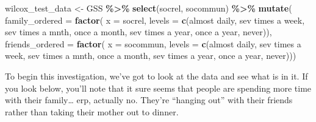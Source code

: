 \documentclass[
]{book}
\newenvironment{Shaded}{\begin{snugshade}}{\end{snugshade}}
\newcommand{\AttributeTok}[1]{\textcolor[rgb]{0.13,0.29,0.53}{#1}}
\newcommand{\FunctionTok}[1]{\textcolor[rgb]{0.13,0.29,0.53}{\textbf{#1}}}
\newcommand{\NormalTok}[1]{#1}
\newcommand{\OtherTok}[1]{\textcolor[rgb]{0.56,0.35,0.01}{#1}}
\newcommand{\SpecialCharTok}[1]{\textcolor[rgb]{0.81,0.36,0.00}{\textbf{#1}}}
\newcommand{\StringTok}[1]{\textcolor[rgb]{0.31,0.60,0.02}{#1}}
\theoremstyle{definition}
\theoremstyle{definition}
\theoremstyle{definition}
\theoremstyle{definition}
\theoremstyle{remark}
\begin{document}
\begin{Shaded}
\begin{Highlighting}[]
\NormalTok{wilcox\_test\_data }\OtherTok{\textless{}{-}}\NormalTok{ GSS }\SpecialCharTok{\%\textgreater{}\%} 
  \FunctionTok{select}\NormalTok{(socrel, socommun) }\SpecialCharTok{\%\textgreater{}\%}
  \FunctionTok{mutate}\NormalTok{(}
    \AttributeTok{family\_ordered =} \FunctionTok{factor}\NormalTok{(}
      \AttributeTok{x      =}\NormalTok{ socrel, }
      \AttributeTok{levels =} \FunctionTok{c}\NormalTok{(}\StringTok{\textquotesingle{}almost daily\textquotesingle{}}\NormalTok{, }\StringTok{\textquotesingle{}sev times a week\textquotesingle{}}\NormalTok{, }
                 \StringTok{\textquotesingle{}sev times a mnth\textquotesingle{}}\NormalTok{, }\StringTok{\textquotesingle{}once a month\textquotesingle{}}\NormalTok{,}
                 \StringTok{\textquotesingle{}sev times a year\textquotesingle{}}\NormalTok{, }\StringTok{\textquotesingle{}once a year\textquotesingle{}}\NormalTok{, }\StringTok{\textquotesingle{}never\textquotesingle{}}\NormalTok{)),}
    \AttributeTok{friends\_ordered =} \FunctionTok{factor}\NormalTok{(}
      \AttributeTok{x      =}\NormalTok{ socommun, }
      \AttributeTok{levels =} \FunctionTok{c}\NormalTok{(}\StringTok{\textquotesingle{}almost daily\textquotesingle{}}\NormalTok{, }\StringTok{\textquotesingle{}sev times a week\textquotesingle{}}\NormalTok{, }
                 \StringTok{\textquotesingle{}sev times a mnth\textquotesingle{}}\NormalTok{, }\StringTok{\textquotesingle{}once a month\textquotesingle{}}\NormalTok{,}
                 \StringTok{\textquotesingle{}sev times a year\textquotesingle{}}\NormalTok{, }\StringTok{\textquotesingle{}once a year\textquotesingle{}}\NormalTok{, }\StringTok{\textquotesingle{}never\textquotesingle{}}\NormalTok{))) }
\end{Highlighting}
\end{Shaded}

To begin this investigation, we've got to look at the data and see what is in it. If you look below, you'll note that it sure seems that people are spending more time with their family\ldots{} erp, actually no. They're ``hanging out'' with their friends rather than taking their mother out to dinner.
\end{document}
